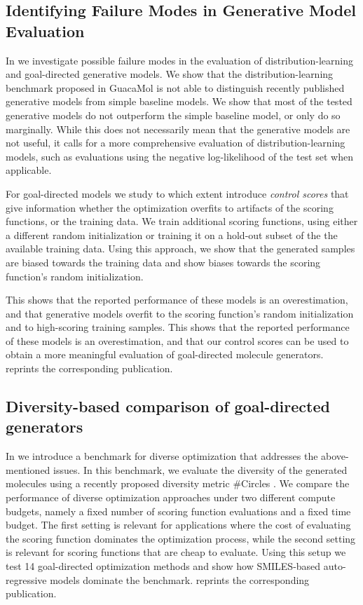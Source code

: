 \subsection{Identifying Failure Modes in Generative Model Evaluation}
In \citep{renzFailureModesMolecule2019} we investigate possible failure modes in the evaluation of
distribution-learning and goal-directed generative models. We show that the distribution-learning
benchmark proposed in GuacaMol \citep{brownGuacaMolBenchmarkingModels2019} is not able to
distinguish recently published generative models from simple baseline models. We show that most of
the tested generative models do not outperform the simple baseline model, or only do so marginally.
While this does not necessarily mean that the generative models are not useful, it calls for a more
comprehensive evaluation of distribution-learning models, such as evaluations using the negative
log-likelihood of the test set when applicable.

For goal-directed models we study to which extent introduce \emph{control scores} that give information whether the
optimization overfits to artifacts of the scoring functions, or the training data. We train
additional scoring functions, using either a different random initialization or training it
on a hold-out subset of the the available training data. Using this approach, we show that
the generated samples are biased towards the training data and show biases towards the
scoring function's random initialization.

This shows that the reported performance of these models is an overestimation, and
that generative models overfit to the scoring function's random initialization and to high-scoring
training samples. This shows that the reported performance of these models is an overestimation, and
that our control scores can be used to obtain a more meaningful evaluation of goal-directed molecule
generators.  reprints the corresponding publication.

\subsection{Diversity-based comparison of goal-directed generators\label{sec:divopt}} In
\citep{renzDiverseHitsNovo2024} we introduce a benchmark for diverse optimization
that addresses the above-mentioned issues. In this benchmark, we evaluate the diversity of the
generated molecules using a recently proposed diversity metric \#Circles
\citep{xieHowMuchSpace2023}. We compare the performance of diverse optimization approaches under two
different compute budgets, namely a fixed number of scoring function evaluations and a fixed time
budget. The first setting is relevant for applications where the cost of evaluating the scoring
function dominates the optimization process, while the second setting is relevant for scoring
functions that are cheap to evaluate. Using this setup we test 14 goal-directed optimization methods
and show how SMILES-based auto-regressive models dominate the benchmark. 
reprints the corresponding publication.

